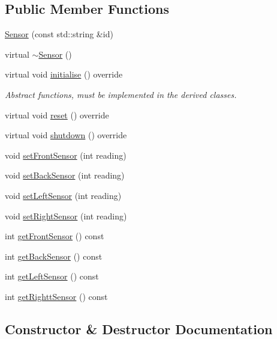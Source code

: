 \subsection*{Public Member Functions}
\begin{DoxyCompactItemize}
\item 
\hyperlink{class_sensor_a8615bafe3f2aa8f8b12b1199eaa577c4}{Sensor} (const std\+::string \&id)
\item 
virtual \hyperlink{class_sensor_aa730e9961dd645e9df9644c52b6e72eb}{$\sim$\+Sensor} ()
\item 
virtual void \hyperlink{class_sensor_aa6175cacabc044409786f6d43a72ae29}{initialise} () override
\begin{DoxyCompactList}\small\item\em Abstract functions, must be implemented in the derived classes. \end{DoxyCompactList}\item 
virtual void \hyperlink{class_sensor_a004fc50012f81dbfdce7a2541fa6130d}{reset} () override
\item 
virtual void \hyperlink{class_sensor_a9b3ea7f61f41b68a4fb9141d887a7271}{shutdown} () override
\item 
void \hyperlink{class_sensor_a232cfa2eba02b76485a79c056823add6}{set\+Front\+Sensor} (int reading)
\item 
void \hyperlink{class_sensor_ab473ccb1bf431fa351557c5c9de3dd42}{set\+Back\+Sensor} (int reading)
\item 
void \hyperlink{class_sensor_aa801b7317f2185df148903d99a421555}{set\+Left\+Sensor} (int reading)
\item 
void \hyperlink{class_sensor_af82bc6d823e34180bfcd6e4d33452d2c}{set\+Right\+Sensor} (int reading)
\item 
int \hyperlink{class_sensor_a0e4445ad2a53389b593c0cc980cbd0fa}{get\+Front\+Sensor} () const 
\item 
int \hyperlink{class_sensor_a2a6d9722dec48cbd3b1c7868e29f3da6}{get\+Back\+Sensor} () const 
\item 
int \hyperlink{class_sensor_a1a10f4b48c98e23a0e65dd161a0f6fd1}{get\+Left\+Sensor} () const 
\item 
int \hyperlink{class_sensor_a7e8723c2635a7eff0e130b4ca27451a7}{get\+Rightt\+Sensor} () const 
\end{DoxyCompactItemize}


\subsection{Constructor \& Destructor Documentation}

